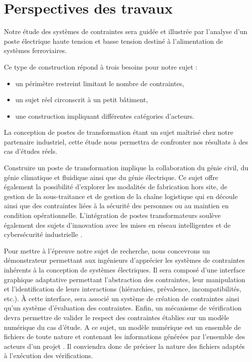 \documentclass[a4paper,12pt]{article}
\begin{document}
\section{Perspectives des travaux}
\label{sec:orgb3244b7}
Notre étude des systèmes de contraintes sera guidée et illustrée par l’analyse d’un poste électrique haute tension et basse tension destiné à l'alimentation de systèmes ferroviaires. 

Ce type de construction répond à trois besoins pour notre sujet : 
\begin{itemize}
\item un périmètre restreint limitant le nombre de contraintes,
\item un sujet réel circonscrit à un petit bâtiment,
\item une construction impliquant différentes catégories d’acteurs.
\end{itemize}

La conception de postes de transformation étant un sujet maîtrisé chez notre partenaire industriel, cette étude nous permettra de confronter nos résultats à des cas d’études réels. 

Construire un poste de transformation implique la collaboration du génie civil, du génie climatique et fluidique ainsi que du génie électrique. Ce sujet offre également la possibilité d’explorer les modalités de fabrication hors site, de gestion de la sous-traitance et de gestion de la chaîne logistique qui en découle ainsi que des contraintes liées à la sécurité des personnes ou au maintien en condition opérationnelle. L’intégration de postes transformateurs soulève également des sujets d'innovation avec les mises en réseau intelligentes et de cybersécurité industrielle \autocite{flausCybersecuriteInstallationsIndustrielles2018a}.

Pour mettre à l’épreuve notre sujet de recherche, nous concevrons un démonstrateur permettant aux ingénieurs d’apprécier les systèmes de contraintes inhérents à la conception de systèmes électriques. Il sera composé d’une interface graphique adaptative permettant l’abstraction des contraintes, leur manipulation et l’identification de leurs interactions (hiérarchies, prévalence, incompatibilités, etc.). À cette interface, sera associé un système de création de contraintes ainsi qu’un système d’évaluation des contraintes. Enfin, un mécanisme de vérification devra permettre de valider le respect des contraintes établies sur un modèle numérique du cas d’étude. A ce sujet, un modèle numérique est un ensemble de fichiers de toute nature et contenant les informations générées par l’ensemble des acteurs d’un projet \autocite{OrganisationNumerisationInformations2018a}. Il conviendra donc de préciser la nature des fichiers adaptés à l'exécution des vérifications.
\end{document}
